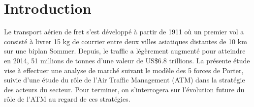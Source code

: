 
\pagebreak

\section*{Introduction}

Le transport aérien de fret s'est développé à partir de 1911 où un
premier vol a consisté à livrer 15 kg de courrier entre deux villes asiatiques
distantes de 10 km sur une biplan Sommer. Depuis, le traffic a légèrement augmenté pour
atteindre en 2014, 51 millions de tonnes d'une valeur de US\$6.8 trillions. 
La présente étude vise à effectuer une analyse de marché suivant le modèle des 5 forces de Porter,
suivie d'une étude du rôle de l'Air Traffic Management (ATM) dans la stratégie des acteurs du secteur.
Pour terminer, on s'interrogera sur l'évolution future du rôle de l'ATM au regard de ces stratégies. 
   



